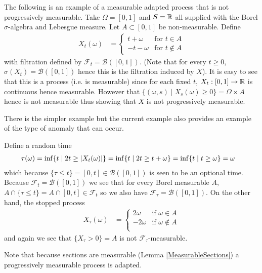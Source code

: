 \begin{examp}The following is an example of a measurable adapted process that is not
  progressively measurable.  Take $\Omega=[0,1]$ and $S = \mathbb{R}$ all
  supplied with the Borel $\sigma$-algebra and Lebesgue measure.
Let $A \subset [0,1]$ be non-measurable.  Define
\begin{align*}
X_t(\omega) &= \begin{cases}
t + \omega & \text{for $t \in A$} \\
-t - \omega & \text{for $t \notin A$}
\end{cases}
\end{align*}
with filtration defined by $\mathcal{F}_t = \mathcal{B}([0,1])$. 
(Note that for every $t\geq 0$, $\sigma(X_t) =
\mathcal{B}([0,1])$ hence this is the filtration induced by $X$).   It
is easy to see that this is a process (i.e. is measurable) since for
each fixed $t$, $X_t : [0,1] \to \mathbb{R}$ is continuous hence measurable.
However that $\lbrace (\omega,s) \mid X_s(\omega) \geq 0\rbrace = \Omega
\times A$ hence is not measurable thus showing that $X$ is not
progressively measurable.

There is the simpler example but the current example also provides an
example of the type of anomaly that can occur.

Define a random time 
\begin{align*}
\tau(\omega) &= \inf \lbrace t \mid 2t \geq \left \vert X_t(\omega) \right \vert \rbrace = \inf \lbrace t
\mid 2t \geq t + \omega \rbrace = \inf \lbrace t
\mid t \geq \omega \rbrace = \omega
\end{align*}
which because $\lbrace \tau \leq t \rbrace = [0,t] \in
\mathcal{B}([0,1])$ is seen to be an optional time.
Because $\mathcal{F}_t = \mathcal{B}([0,1])$ we see that for every
Borel measurable $A$, $A \cap \lbrace \tau \leq t \rbrace = A \cap
[0,t] \in \mathcal{F}_t$ so we also have $\mathcal{F}_\tau =
\mathcal{B}([0,1])$.  On the other hand, the stopped process
\begin{align*}
X_\tau(\omega) &= \begin{cases}
2\omega & \text{if $\omega \in A$} \\
-2\omega & \text{if $\omega \notin A$} \\
\end{cases}
\end{align*}
and again we see that $\lbrace X_\tau > 0 \rbrace = A$  is not
$\mathcal{F}_\tau$-measurable.
\end{examp}

Note that because sections are measurable (Lemma
\ref{MeasurableSections}) a progressively measurable process is
adapted.

